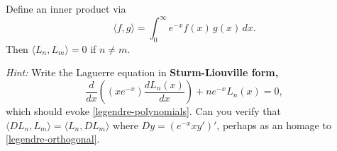 \documentclass{homework}
\begin{document}
\begin{problem}
  Define an inner product via
  \[
    \langle f, g \rangle = \int_0^\infty e^{-x} f(x) \, g(x) \, dx.
  \]
  Then $\langle L_n, L_m \rangle = 0$ if $n \neq m$.
  
  \textit{Hint:}  Write the Laguerre equation in \textbf{Sturm-Liouville form,}
  \[
    \frac{d}{dx}\left(\left(x e^{-x}\right){\frac {d L_{n}(x)}{dx}}\right)+ n e^{-x} L_{n}(x)=0,
  \]
  which should evoke \ref{legendre-polynomials}.  Can you verify that $\langle D L_n, L_m \rangle = \langle L_n, DL_m \rangle$ where $Dy = (e^{-x} x y')'$, perhaps as an homage to \ref{legendre-orthogonal}.
\end{problem}

\end{document}
